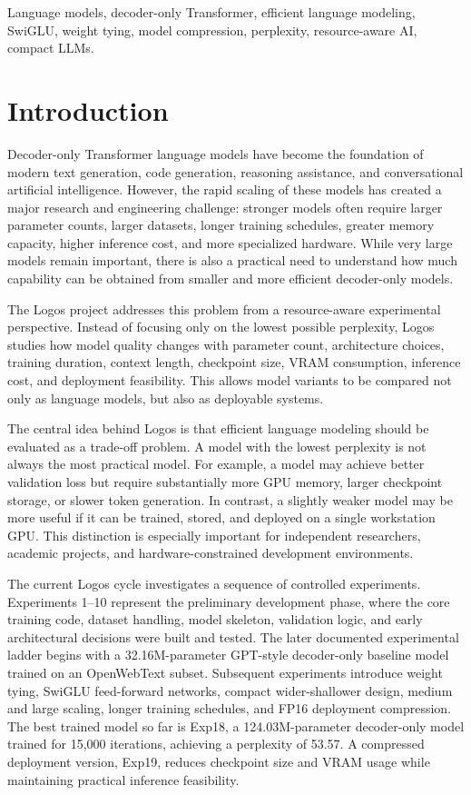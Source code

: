 \documentclass[conference]{IEEEtran}
\begin{document}
\begin{IEEEkeywords}
Language models, decoder-only Transformer, efficient language modeling, SwiGLU, weight tying, model compression, perplexity, resource-aware AI, compact LLMs.
\end{IEEEkeywords}

\section{Introduction}

Decoder-only Transformer language models have become the foundation of modern text generation, code generation, reasoning assistance, and conversational artificial intelligence. However, the rapid scaling of these models has created a major research and engineering challenge: stronger models often require larger parameter counts, larger datasets, longer training schedules, greater memory capacity, higher inference cost, and more specialized hardware. While very large models remain important, there is also a practical need to understand how much capability can be obtained from smaller and more efficient decoder-only models.

The Logos project addresses this problem from a resource-aware experimental perspective. Instead of focusing only on the lowest possible perplexity, Logos studies how model quality changes with parameter count, architecture choices, training duration, context length, checkpoint size, VRAM consumption, inference cost, and deployment feasibility. This allows model variants to be compared not only as language models, but also as deployable systems.

The central idea behind Logos is that efficient language modeling should be evaluated as a trade-off problem. A model with the lowest perplexity is not always the most practical model. For example, a model may achieve better validation loss but require substantially more GPU memory, larger checkpoint storage, or slower token generation. In contrast, a slightly weaker model may be more useful if it can be trained, stored, and deployed on a single workstation GPU. This distinction is especially important for independent researchers, academic projects, and hardware-constrained development environments.

The current Logos cycle investigates a sequence of controlled experiments. Experiments 1--10 represent the preliminary development phase, where the core training code, dataset handling, model skeleton, validation logic, and early architectural decisions were built and tested. The later documented experimental ladder begins with a 32.16M-parameter GPT-style decoder-only baseline model trained on an OpenWebText subset. Subsequent experiments introduce weight tying, SwiGLU feed-forward networks, compact wider-shallower design, medium and large scaling, longer training schedules, and FP16 deployment compression. The best trained model so far is Exp18, a 124.03M-parameter decoder-only model trained for 15,000 iterations, achieving a perplexity of 53.57. A compressed deployment version, Exp19, reduces checkpoint size and VRAM usage while maintaining practical inference feasibility.
\end{document}
